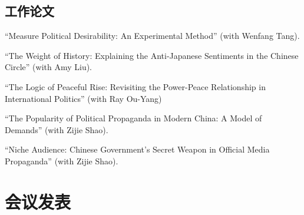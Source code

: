 \documentclass[10.5pt,]{article}
\begin{document}
\subsection{工作论文}

``Measure Political Desirability: An Experimental Method'' (with Wenfang
Tang).

``The Weight of History: Explaining the Anti-Japanese Sentiments in the
Chinese Circle'' (with Amy Liu).

``The Logic of Peaceful Rise: Revisiting the Power-Peace Relationship in
International Politics'' (with Ray Ou-Yang)

``The Popularity of Political Propaganda in Modern China: A Model of
Demands'' (with Zijie Shao).

``Niche Audience: Chinese Government's Secret Weapon in Official Media
Propaganda'' (with Zijie Shao).

\section{会议发表}
\end{document}
